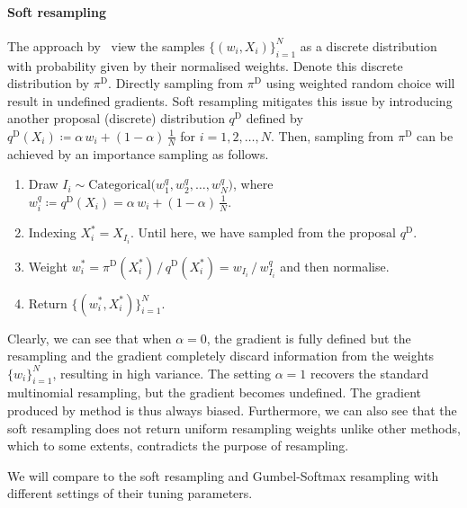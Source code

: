 \documentclass{article}
\begin{document}
\paragraph{Soft resampling} The approach by~\citet{Karkus2018} view the samples $\lbrace (w_i, X_i) \rbrace_{i=1}^N$ as a discrete distribution with probability given by their normalised weights.
Denote this discrete distribution by $\pi^{\mathrm{D}}$. 
Directly sampling from $\pi^{\mathrm{D}}$ using weighted random choice will result in undefined gradients. 
Soft resampling mitigates this issue by introducing another proposal (discrete) distribution $q^{\mathrm{D}}$ defined by $q^{\mathrm{D}}(X_i) \coloneqq \alpha \, w_i + (1 - \alpha) \, \frac{1}{N}$ for $i=1,2,\ldots, N$. 
Then, sampling from $\pi^{\mathrm{D}}$ can be achieved by an importance sampling as follows.
%
\begin{enumerate}
    \item Draw $I_i \sim \mathrm{Categorical}\bigl( w^q_1, w^q_2, \ldots, w^q_N \bigr)$, where $w^q_i \coloneqq q^{\mathrm{D}}(X_i) = \alpha \, w_i + (1 - \alpha) \, \frac{1}{N}$. 
    \item Indexing $X^*_i = X_{I_i}$. Until here, we have sampled from the proposal $q^{\mathrm{D}}$. 
    \item Weight $w^*_i = \pi^{\mathrm{D}}(X^*_i) \, / \, q^{\mathrm{D}}(X^*_i) = w_{I_i} \, / \, w^q_{I_i}$ and then normalise. 
    \item Return $ \lbrace (w_i^*, X_i^*) \rbrace_{i=1}^N$. 
\end{enumerate}
%
Clearly, we can see that when $\alpha=0$, the gradient is fully defined but the resampling and the gradient completely discard information from the weights $\lbrace w_i \rbrace_{i=1}^N$, resulting in high variance. 
The setting $\alpha=1$ recovers the standard multinomial resampling, but the gradient becomes undefined. 
The gradient produced by method is thus always biased.
Furthermore, we can also see that the soft resampling does not return uniform resampling weights unlike other methods, which to some extents, contradicts the purpose of resampling. 

We will compare to the soft resampling and Gumbel-Softmax resampling with different settings of their tuning parameters. 
\end{document}
